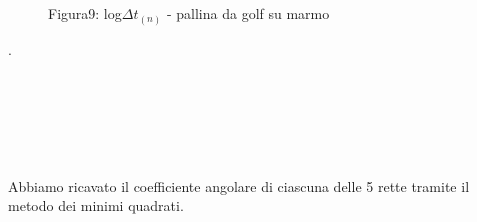 \documentclass[a4paper]{article}
\theoremstyle{definition}
\begin{document}
	\begin{figure}[!ht]
		\captionsetup{labelformat=empty}
		\caption{Figura9: log\(\Delta t_{(n)}\) - pallina da golf su marmo}
	\end{figure}
.\\\\\\\\\\\\\\
	\noindent Abbiamo ricavato il coefficiente angolare di ciascuna delle 5 rette tramite il metodo dei minimi quadrati.
	
	\begin{figure}[!htbp]
		\captionsetup{labelformat=empty}

	\end{figure}
	
\end{document}
